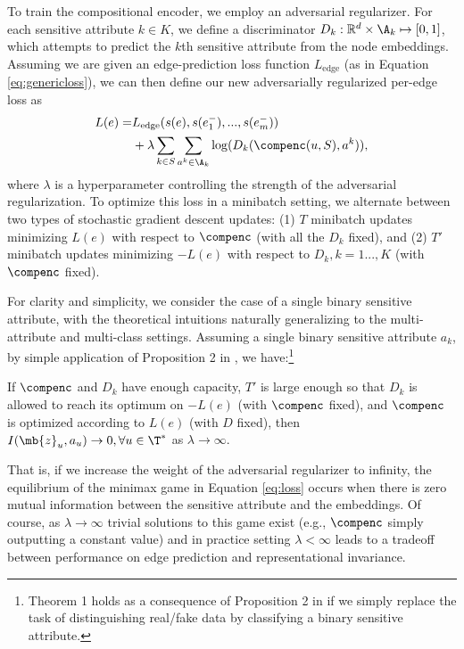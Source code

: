 To train the compositional encoder, we employ an adversarial regularizer. %
For each sensitive attribute $k \in K$, we define a discriminator $D_k : \mathbb{R}^{d} \times \A_k \mapsto [0,1]$, which attempts to predict the $k$th sensitive attribute from the node embeddings. 
Assuming we are given an edge-prediction loss function $L_\textrm{edge}$ (as in Equation \ref{eq:genericloss}), we can then define our new adversarially regularized per-edge loss as
\begin{align}\label{eq:loss}
    L(e) = &L_{\textrm{edge}}(s(e), s(e^{-}_1), ..., s(e^{-}_m)) \nonumber \\ &+ \lambda \sum_{k \in S}\sum_{a^k \in \A_k}\log(D_k(\compenc(u, S), a^k)),
\end{align}
where $\lambda$ is a hyperparameter controlling the strength of the adversarial regularization.
To optimize this loss in a minibatch setting, we alternate between two types of stochastic gradient descent updates: (1) $T$ minibatch updates minimizing $L(e)$ with respect to $\compenc$ (with all the $D_k$ fixed), and (2) $T'$ minibatch updates minimizing $-L(e)$ with respect to $D_k, k=1...,K$ (with $\compenc$ fixed).

For clarity and simplicity, we consider the case of a single binary sensitive attribute, with the theoretical intuitions naturally generalizing to the multi-attribute and multi-class settings.
Assuming a single binary sensitive attribute $a_k$, by simple application of Proposition 2 in \citet{goodfellow2014generative}, we have:\footnote{Theorem 1 holds as a consequence of Proposition 2 in \citet{goodfellow2014generative} if we simply replace the task of distinguishing real/fake data by classifying a binary sensitive attribute. }
\begin{theorem}
If $\compenc$ and $D_k$ have enough capacity, $T'$ is large enough so that $D_k$
is allowed to reach its optimum on $-L(e)$ (with $\compenc$ fixed), and $\compenc$ is optimized according to $L(e)$ (with $D$ fixed), then $I(\mb{z}_u, a_u) \rightarrow 0, \forall u \in \T^*$ as $\lambda \rightarrow \infty$. 
\end{theorem}

That is, if we increase the weight of the adversarial regularizer to infinity, the equilibrium of the minimax game in Equation \eqref{eq:loss} occurs when there is zero mutual information between the sensitive attribute and the embeddings. 
Of course, as $\lambda \rightarrow \infty$ trivial solutions to this game exist (e.g., $\compenc$ simply outputting a constant value) and in practice setting $\lambda < \infty$ leads to a tradeoff between performance on edge prediction and representational invariance.
